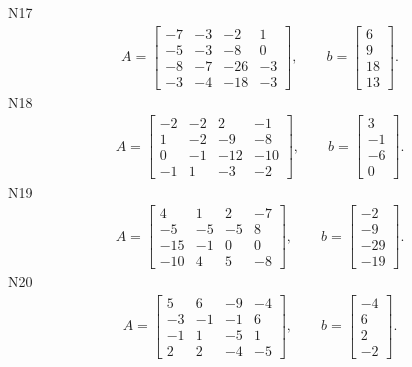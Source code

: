 \documentclass[11pt]{report}
\begin{document}
N17
\begin{align*}
 A = \left[\begin{matrix}-7 & -3 & -2 & 1\\-5 & -3 & -8 & 0\\-8 & -7 & -26 & -3\\-3 & -4 & -18 & -3\end{matrix}\right],
\qquad b = \left[\begin{matrix}6\\9\\18\\13\end{matrix}\right]. 
 \end{align*}
N18
\begin{align*}
 A = \left[\begin{matrix}-2 & -2 & 2 & -1\\1 & -2 & -9 & -8\\0 & -1 & -12 & -10\\-1 & 1 & -3 & -2\end{matrix}\right],
\qquad b = \left[\begin{matrix}3\\-1\\-6\\0\end{matrix}\right]. 
 \end{align*}
N19
\begin{align*}
 A = \left[\begin{matrix}4 & 1 & 2 & -7\\-5 & -5 & -5 & 8\\-15 & -1 & 0 & 0\\-10 & 4 & 5 & -8\end{matrix}\right],
\qquad b = \left[\begin{matrix}-2\\-9\\-29\\-19\end{matrix}\right]. 
 \end{align*}
N20
\begin{align*}
 A = \left[\begin{matrix}5 & 6 & -9 & -4\\-3 & -1 & -1 & 6\\-1 & 1 & -5 & 1\\2 & 2 & -4 & -5\end{matrix}\right],
\qquad b = \left[\begin{matrix}-4\\6\\2\\-2\end{matrix}\right]. 
 \end{align*}
\end{document}
